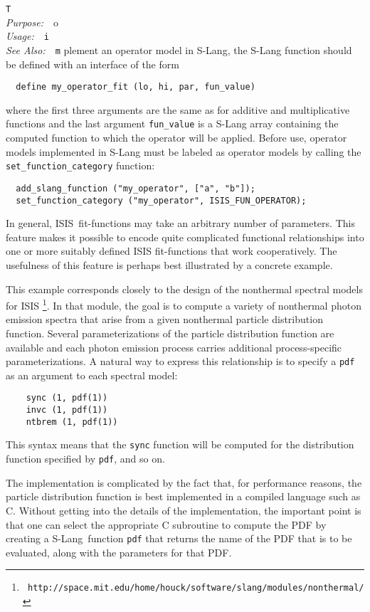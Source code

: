 \documentclass{book}
\makeatletter
\newif\ifpdf
\newcommand{\isis}{{\sc ISIS}}
\newcommand{\slang}{{\sc S-Lang}}
\newenvironment{isisfunction}[4]%
{\index{{#1}@{\tt #1}}%
  \ifpdf
  \else
     \addcontentsline{toc}{subsection}{{#1} -- {#2}}
  \fi
  \vbox{
          \vspace*{\baselineskip}
          {\LARGE\tt #1}\vspace*{\baselineskip}\\
          {{\it Purpose:}~~{#2}}\\
          {{\it Usage:}~~{\tt #3}}\\
          {{\it See Also:}~~{\tt #4}}
       }
}%
{ }
\makeatother
\begin{document}
{\begin{isisfunction}
To implement an operator model in S-Lang, the S-Lang function
should be defined with an interface of the form
\begin{verbatim}
  define my_operator_fit (lo, hi, par, fun_value)
\end{verbatim}
where the first three arguments are the same as for additive
and multiplicative functions and the last argument
\verb|fun_value| is a S-Lang array containing the computed
function to which the operator will be applied. Before use,
operator models implemented in S-Lang must be labeled as
operator models by calling the \verb|set_function_category|
function:
\begin{verbatim}
  add_slang_function ("my_operator", ["a", "b"]);
  set_function_category ("my_operator", ISIS_FUN_OPERATOR);
\end{verbatim}

In general, \isis\ fit-functions may take an arbitrary number
of parameters.  This feature makes it possible to encode quite
complicated functional relationships into one or more suitably
defined ISIS fit-functions that work cooperatively. The
usefulness of this feature is perhaps best illustrated by a
concrete example.

This example corresponds closely to the design of the
nonthermal spectral models for \isis
\footnote{{\tt
http://space.mit.edu/home/houck/software/slang/modules/nonthermal/}}.
In that module, the goal is to compute a variety of nonthermal
photon emission spectra that arise from a given nonthermal
particle distribution function. Several
parameterizations of the particle distribution function are
available and each photon emission process carries additional
process-specific parameterizations.  A natural way to express
this relationship is to specify a \verb|pdf| as an argument
to each spectral model:
\begin{verbatim}
    sync (1, pdf(1))
    invc (1, pdf(1))
    ntbrem (1, pdf(1))
\end{verbatim}
This syntax means that the \verb|sync| function will be
computed for the distribution function specified by \verb|pdf|,
and so on.

The implementation is complicated by the fact that, for
performance reasons, the particle distribution function is best
implemented in a compiled language such as C.  Without getting
into the details of the implementation, the important point is
that one can select the appropriate C subroutine to compute the
PDF by creating a \slang\ function \verb|pdf| that returns the
name of the PDF that is to be evaluated, along with the
parameters for that PDF.


\end{isisfunction}}
\end{document}
